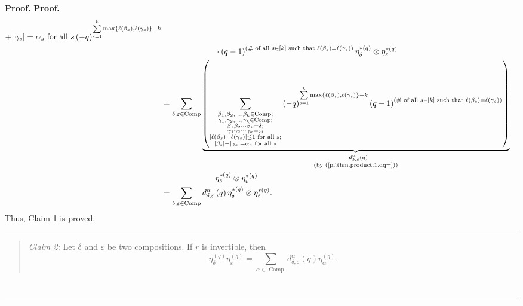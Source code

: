 \documentclass[numbers=enddot,12pt,final,onecolumn,notitlepage]{scrartcl}%
\theoremstyle{definition}
\newenvironment{statement}{\begin{quote}}{\end{quote}}
\newenvironment{proof}[1][Proof]{\noindent\textbf{#1.} }{\ \rule{0.5em}{0.5em}}
\let\sumnonlimits\sum
\renewcommand{\sum}{\sumnonlimits\limits}
\begin{document}
\begin{proof}
\begin{proof}
\begin{align*}
{{+\left\vert \gamma_{s}\right\vert =\alpha_{s}\text{ for all }s}}\left(
-q\right)  ^{\sum_{s=1}^{k}\max\left\{  \ell\left(  \beta_{s}\right)
,\ell\left(  \gamma_{s}\right)  \right\}  -k}\\
&  \ \ \ \ \ \ \ \ \ \ \ \ \ \ \ \ \ \ \ \ \cdot\left(  q-1\right)  ^{\left(
\text{\# of all }s\in\left[  k\right]  \text{ such that }\ell\left(  \beta
_{s}\right)  =\ell\left(  \gamma_{s}\right)  \right)  }\eta_{\delta}%
^{\ast\left(  q\right)  }\otimes\eta_{\varepsilon}^{\ast\left(  q\right)  }\\
&  =\sum_{\delta,\varepsilon\in\operatorname*{Comp}}\underbrace{\left(
\sum_{\substack{\beta_{1},\beta_{2},\ldots,\beta_{k}\in\operatorname*{Comp}%
;\\\gamma_{1},\gamma_{2},\ldots,\gamma_{k}\in\operatorname*{Comp};\\\beta
_{1}\beta_{2}\cdots\beta_{k}=\delta;\\\gamma_{1}\gamma_{2}\cdots\gamma
_{k}=\varepsilon;\\\left\vert \ell\left(  \beta_{s}\right)  -\ell\left(
\gamma_{s}\right)  \right\vert \leq1\text{ for all }s;\\\left\vert \beta
_{s}\right\vert +\left\vert \gamma_{s}\right\vert =\alpha_{s}\text{ for all
}s}}\left(  -q\right)  ^{\sum_{s=1}^{k}\max\left\{  \ell\left(  \beta
_{s}\right)  ,\ell\left(  \gamma_{s}\right)  \right\}  -k}\left(  q-1\right)
^{\left(  \text{\# of all }s\in\left[  k\right]  \text{ such that }\ell\left(
\beta_{s}\right)  =\ell\left(  \gamma_{s}\right)  \right)  }\right)
}_{\substack{=d_{\delta,\varepsilon}^{\alpha}\left(  q\right)  \\\text{(by
(\ref{pf.thm.product.1.dq=}))}}}\\
&  \ \ \ \ \ \ \ \ \ \ \ \ \ \ \ \ \ \ \ \ \eta_{\delta}^{\ast\left(
q\right)  }\otimes\eta_{\varepsilon}^{\ast\left(  q\right)  }\\
&  =\sum_{\delta,\varepsilon\in\operatorname*{Comp}}d_{\delta,\varepsilon
}^{\alpha}\left(  q\right)  \eta_{\delta}^{\ast\left(  q\right)  }\otimes
\eta_{\varepsilon}^{\ast\left(  q\right)  }.
\end{align*}
Thus, Claim 1 is proved.
\end{proof}

\begin{statement}
\textit{Claim 2:} Let $\delta$ and $\varepsilon$ be two compositions. If $r$
is invertible, then%
\[
\eta_{\delta}^{\left(  q\right)  }\eta_{\varepsilon}^{\left(  q\right)  }%
=\sum_{\alpha\in\operatorname*{Comp}}d_{\delta,\varepsilon}^{\alpha}\left(
q\right)  \eta_{\alpha}^{\left(  q\right)  }.
\]


\end{statement}
\end{proof}
\end{document}
